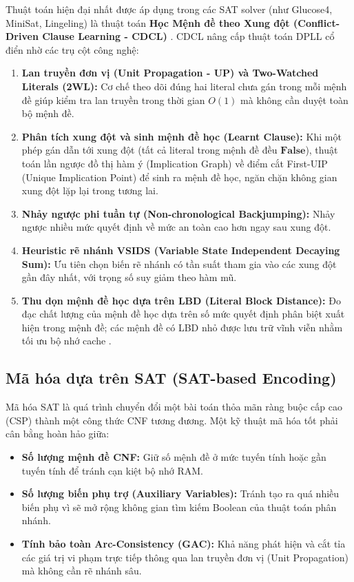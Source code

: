 \documentclass[a4paper,fleqn]{cas-sc}
\begin{document}
Thuật toán hiện đại nhất được áp dụng trong các SAT solver (như Glucose4, MiniSat, Lingeling) là thuật toán \textbf{Học Mệnh đề theo Xung đột (Conflict-Driven Clause Learning - CDCL)} \cite{moskewicz2001chaff,audemard2009predicting,biere2010lingeling}. CDCL nâng cấp thuật toán DPLL cổ điển nhờ các trụ cột công nghệ:
\begin{enumerate}
    \item \textbf{Lan truyền đơn vị (Unit Propagation - UP) và Two-Watched Literals (2WL):} Cơ chế theo dõi đúng hai literal chưa gán trong mỗi mệnh đề giúp kiểm tra lan truyền trong thời gian $O(1)$ mà không cần duyệt toàn bộ mệnh đề.
    \item \textbf{Phân tích xung đột và sinh mệnh đề học (Learnt Clause):} Khi một phép gán dẫn tới xung đột (tất cả literal trong mệnh đề đều $\mathbf{False}$), thuật toán lần ngược đồ thị hàm ý (Implication Graph) về điểm cắt First-UIP (Unique Implication Point) để sinh ra mệnh đề học, ngăn chặn không gian xung đột lặp lại trong tương lai.
    \item \textbf{Nhảy ngược phi tuần tự (Non-chronological Backjumping):} Nhảy ngược nhiều mức quyết định về mức an toàn cao hơn ngay sau xung đột.
    \item \textbf{Heuristic rẽ nhánh VSIDS (Variable State Independent Decaying Sum):} Ưu tiên chọn biến rẽ nhánh có tần suất tham gia vào các xung đột gần đây nhất, với trọng số suy giảm theo hàm mũ.
    \item \textbf{Thu dọn mệnh đề học dựa trên LBD (Literal Block Distance):} Đo đạc chất lượng của mệnh đề học dựa trên số mức quyết định phân biệt xuất hiện trong mệnh đề; các mệnh đề có LBD nhỏ được lưu trữ vĩnh viễn nhằm tối ưu bộ nhớ cache \cite{audemard2009predicting}.
\end{enumerate}

\subsection{Mã hóa dựa trên SAT (SAT-based Encoding)}
\label{subsec:sat_encoding_concept}
Mã hóa SAT là quá trình chuyển đổi một bài toán thỏa mãn ràng buộc cấp cao (CSP) thành một công thức CNF tương đương. Một kỹ thuật mã hóa tốt phải cân bằng hoàn hảo giữa:
\begin{itemize}
    \item \textbf{Số lượng mệnh đề CNF:} Giữ số mệnh đề ở mức tuyến tính hoặc gần tuyến tính để tránh cạn kiệt bộ nhớ RAM.
    \item \textbf{Số lượng biến phụ trợ (Auxiliary Variables):} Tránh tạo ra quá nhiều biến phụ vì sẽ mở rộng không gian tìm kiếm Boolean của thuật toán phân nhánh.
    \item \textbf{Tính bảo toàn Arc-Consistency (GAC):} Khả năng phát hiện và cắt tỉa các giá trị vi phạm trực tiếp thông qua lan truyền đơn vị (Unit Propagation) mà không cần rẽ nhánh sâu.
\end{itemize}
\end{document}
